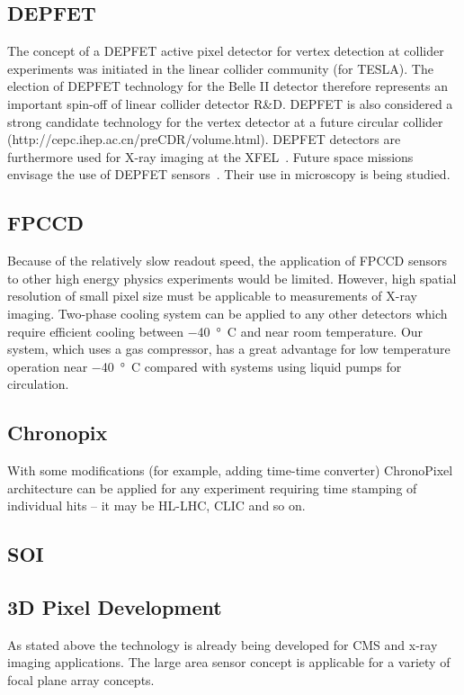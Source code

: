 \subsection{DEPFET}
The concept of a DEPFET active pixel detector for vertex detection at collider experiments was initiated in the linear collider community (for TESLA). The election of DEPFET technology for the Belle II detector therefore represents an important spin-off of linear collider detector R\&D. DEPFET is also considered a strong candidate technology for the vertex detector at a future circular collider (http://cepc.ihep.ac.cn/preCDR/volume.html). DEPFET detectors are furthermore used for X-ray imaging at the XFEL~\cite{xfel}. Future space missions envisage the use of DEPFET sensors~\cite{bepicolombo}. Their use in microscopy is being studied.

\subsection{FPCCD}
    Because of the relatively slow readout speed, the application of FPCCD sensors to other high energy physics experiments would be limited. However, high spatial resolution of small pixel size must be applicable to measurements of X-ray imaging.
    Two-phase  cooling system can be applied to any other detectors which require efficient cooling between \SI{-40}{\degree C} and near room temperature. Our system, which uses a  gas compressor, has a great advantage for low temperature operation near \SI{-40}{\degree C} compared with systems using liquid pumps for circulation.

\subsection{Chronopix}
     With some modifications (for example, adding time-time converter) ChronoPixel architecture can be applied for any experiment requiring time stamping of individual hits -- it may be HL-LHC, CLIC and so on.

\subsection{SOI}

\subsection{3D Pixel Development}
As stated above the technology is already being developed for CMS and x-ray imaging applications.  The large area sensor concept is applicable for a variety of focal plane array concepts.

